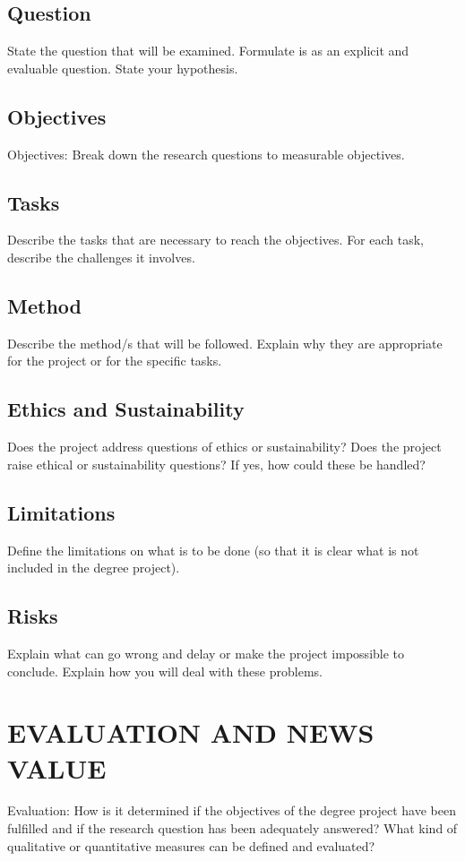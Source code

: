 \documentclass{sigchi}
\begin{document}
\subsection{Question}
State the question that will be examined. Formulate is as an explicit and evaluable question. State your hypothesis.

\subsection{Objectives}
Objectives: Break down the research questions to measurable objectives.

\subsection{Tasks}
Describe the tasks that are necessary to reach the objectives. For each task, describe the challenges it involves.

\subsection{Method}
Describe the method/s that will be followed. Explain why they are appropriate for the project or for the specific tasks.

\subsection{Ethics and Sustainability}
Does the project address questions of ethics or sustainability? Does the project raise ethical or sustainability questions? If yes, how could these be handled?

\subsection{Limitations}
Define the limitations on what is to be done (so that it is clear what is not included in the degree project).

\subsection{Risks}
Explain what can go wrong and delay or make the project impossible to conclude. Explain how you will deal with these problems.

\section{EVALUATION AND NEWS VALUE}
Evaluation: How is it determined if the objectives of the degree project have been fulfilled and if the research question has been adequately answered? What kind of qualitative or quantitative measures can be defined and evaluated?
\end{document}
